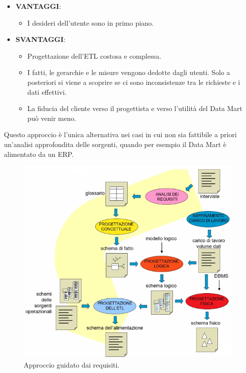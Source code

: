 \begin{itemize}
	\item \textbf{VANTAGGI}:
	\begin{itemize}
		\item I desideri dell'utente sono in primo piano.
	\end{itemize}
	\item \textbf{SVANTAGGI}:
	\begin{itemize}
		\item Progettazione dell'ETL costosa e complessa.
		\item I fatti, le gerarchie e le misure vengono dedotte dagli utenti. Solo a posteriori si viene a scoprire se ci sono inconsistenze tra le richieste e i dati effettivi.
		\item La fiducia del cliente verso il progettista e verso l'utilità del Data Mart può venir meno.
	\end{itemize}
\end{itemize}
\noindent Questo approccio è l'unica alternativa nei casi in cui non sia fattibile a priori un'analisi approfondita delle sorgenti, quando per esempio il Data Mart è alimentato da un ERP.

\begin{figure}[H]
	\begin{center}
		\includegraphics[width=0.6\linewidth]{img/req_approach.png}
		\caption{Approccio guidato dai requisiti.}
	\end{center}
\end{figure}
